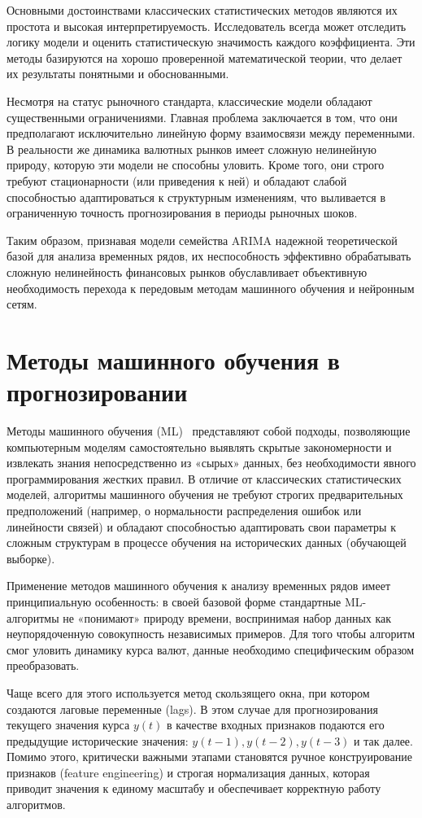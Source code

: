 Основными достоинствами классических статистических методов являются их простота и высокая интерпретируемость. Исследователь всегда может отследить логику модели и оценить статистическую значимость каждого коэффициента. Эти методы базируются на хорошо проверенной математической теории, что делает их результаты понятными и обоснованными.

Несмотря на статус рыночного стандарта, классические модели обладают существенными ограничениями. Главная проблема заключается в том, что они предполагают исключительно линейную форму взаимосвязи между переменными. В реальности же динамика валютных рынков имеет сложную нелинейную природу, которую эти модели не способны уловить. Кроме того, они строго требуют стационарности (или приведения к ней) и обладают слабой способностью адаптироваться к структурным изменениям, что выливается в ограниченную точность прогнозирования в периоды рыночных шоков. 

Таким образом, признавая модели семейства ARIMA надежной теоретической базой для анализа временных рядов, их неспособность эффективно обрабатывать сложную нелинейность финансовых рынков обуславливает объективную необходимость перехода к передовым методам машинного обучения и нейронным сетям.

\section{Методы машинного обучения в прогнозировании}
Методы машинного обучения (ML)~\cite{bishop2006, goodfellow2016} представляют собой подходы, позволяющие компьютерным моделям самостоятельно выявлять скрытые закономерности и извлекать знания непосредственно из «сырых» данных, без необходимости явного программирования жестких правил. В отличие от классических статистических моделей, алгоритмы машинного обучения не требуют строгих предварительных предположений (например, о нормальности распределения ошибок или линейности связей) и обладают способностью адаптировать свои параметры к сложным структурам в процессе обучения на исторических данных (обучающей выборке).

Применение методов машинного обучения к анализу временных рядов имеет принципиальную особенность: в своей базовой форме стандартные ML-алгоритмы не «понимают» природу времени, воспринимая набор данных как неупорядоченную совокупность независимых примеров. Для того чтобы алгоритм смог уловить динамику курса валют, данные необходимо специфическим образом преобразовать.

Чаще всего для этого используется метод скользящего окна, при котором создаются лаговые переменные (lags). В этом случае для прогнозирования текущего значения курса $y(t)$ в качестве входных признаков подаются его предыдущие исторические значения: $y(t−1),y(t−2),y(t−3)$ и так далее. Помимо этого, критически важными этапами становятся ручное конструирование признаков (feature engineering) и строгая нормализация данных, которая приводит значения к единому масштабу и обеспечивает корректную работу алгоритмов.

